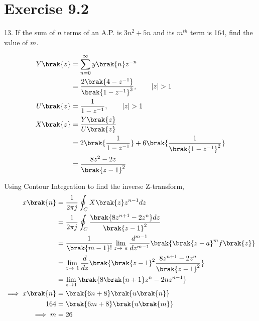 \documentclass[journal,12pt,twocolumn]{IEEEtran}
\begin{document}


\vspace{3cm}

\title{}
\author{EE23BTECH11054 -  Sai Krishna Shanigarapu$^{*}$
}
\maketitle
\newpage
\bigskip



\section*{Exercise 9.2}

13. \hspace{2pt}If the sum of $n$ terms of an A.P. is $3n^2+5n$ and its $m^{th}$ term is 164, find the value of $m$.
\bigskip

\solution
\fi
\begin{align}
Y\brak{z} &=  \sum_{n=0}^{\infty} y\brak{n}z^{-n} \\
&= \frac{2\brak{4-z^{-1}}}{\brak{1-z^{-1}}^3}, \qquad |z| > 1\\
U\brak{z} &= \frac{1}{1-z^{-1}}, \qquad |z| > 1\\
X\brak{z} &=  \frac{Y\brak{z}}{U\brak{z}}\\
 &= 2\brak{\frac{1}{1-z^{-1}}} + 6\brak{\frac{1}{\brak{1-z^{-1}}^2} } \\
 &= \frac{8z^2 - 2z}{\brak{z-1}^2} 
\end{align}


Using Contour Integration to find the inverse Z-transform,
\begin{align}
   x\brak{n} &= \frac{1}{2\pi j}\oint_C X\brak{z}z^{n-1}dz\\
    &= \frac{1}{2\pi j}\oint_C \frac{\brak{8z^{n+1} - 2z^{n}}dz}{\brak{z-1}^2}\\
    &= \frac{1}{\brak{m-1}!}\lim_{z\to\ a}\frac{d^{m-1}}{dz^{m-1}}\brak{\brak{z-a}^m f\brak{z}}\\
    &= \lim_{z\to\ 1}\frac{d}{dz}\brak{\brak{z-1}^2 \frac{8z^{n+1} - 2z^n}{\brak{z-1}^2}}\\
    &= \lim_{z\to 1}\brak{8\brak{n+1}z^n - 2nz^{n-1}}\\
    \implies x\brak{n} &= \brak{6n+8}\brak{u\brak{n}}\\
    164 &= \brak{6m+8}\brak{u\brak{m}}\\
    \implies m &= 26
\end{align}
\end{document}
